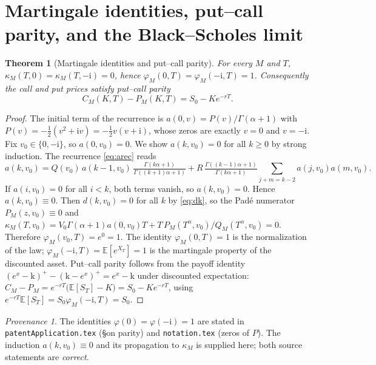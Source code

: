 \documentclass[11pt]{article}
\newcommand{\Ii}{\mathrm{i}}
\theoremstyle{plain}
\newtheorem{theorem}{Theorem}[section]
\theoremstyle{definition}
\theoremstyle{remark}
\newtheorem*{provenance}{Provenance}
\begin{document}
\section{Martingale identities, put--call parity, and the Black--Scholes limit}
\label{sec:parity}

\begin{theorem}[Martingale identities and put--call parity]\label{thm:parity}
For every $M$ and $T$, $\kappa_M(T,0)=\kappa_M(T,-\Ii)=0$, hence
$\varphi_M(0,T)=\varphi_M(-\Ii,T)=1$. Consequently the call and put prices satisfy
put--call parity
\begin{equation}\label{eq:parity}
   C_M(K,T)-P_M(K,T)=S_0-Ke^{-rT}.
\end{equation}
\end{theorem}
\begin{proof}
The initial term of the recurrence is $a(0,v)=P(v)/\Gamma(\alpha+1)$ with
$P(v)=-\tfrac12(v^2+\Ii v)=-\tfrac12 v(v+\Ii)$, whose zeros are exactly $v=0$ and
$v=-\Ii$. Fix $v_0\in\{0,-\Ii\}$, so $a(0,v_0)=0$. We show $a(k,v_0)=0$ for all
$k\ge0$ by strong induction. The recurrence \eqref{eq:arec} reads
\[
   a(k,v_0)=Q(v_0)\,a(k-1,v_0)\,\tfrac{\Gamma(k\alpha+1)}{\Gamma((k+1)\alpha+1)}
   +R\,\tfrac{\Gamma((k-1)\alpha+1)}{\Gamma(k\alpha+1)}
     \!\!\sum_{j+m=k-2}\!\! a(j,v_0)a(m,v_0).
\]
If $a(i,v_0)=0$ for all $i<k$, both terms vanish, so $a(k,v_0)=0$. Hence
$a(k,v_0)\equiv0$. Then $d(k,v_0)=0$ for all $k$ by \eqref{eq:dk}, so the Padé
numerator $P_M(z,v_0)\equiv0$ and
$\kappa_M(T,v_0)=V_0\Gamma(\alpha+1)a(0,v_0)T+T\,P_M(T^\alpha,v_0)/Q_M(T^\alpha,v_0)=0$.
Therefore $\varphi_M(v_0,T)=e^{0}=1$. The identity $\varphi_M(0,T)=1$ is the
normalization of the law; $\varphi_M(-\Ii,T)=\mathbb E[e^{X_T}]=1$ is the martingale
property of the discounted asset. Put--call parity follows from the payoff identity
$(e^{x}-\mathrm{k})^+-(\mathrm{k}-e^{x})^+=e^{x}-\mathrm k$ under discounted
expectation: $C_M-P_M=e^{-rT}\bigl(\mathbb E[S_T]-K\bigr)=S_0-Ke^{-rT}$, using
$e^{-rT}\mathbb E[S_T]=S_0\varphi_M(-\Ii,T)=S_0$.
\end{proof}
\begin{provenance}
The identities $\varphi(0)=\varphi(-\Ii)=1$ are stated in
\texttt{patentApplication.tex} (\S on parity) and \texttt{notation.tex} (zeros of
$P$). The induction $a(k,v_0)\equiv0$ and its propagation to $\kappa_M$ is supplied
here; both source statements are \emph{correct}.
\end{provenance}
\end{document}
